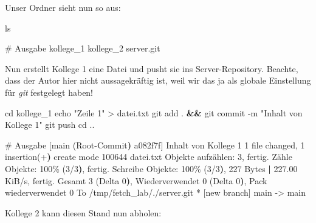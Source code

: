 \documentclass[
  ngerman,
  letterpaper,
  DIV=11]{scrreprt}
\newenvironment{Shaded}{\begin{snugshade}}{\end{snugshade}}
\newcommand{\AttributeTok}[1]{\textcolor[rgb]{0.40,0.45,0.13}{#1}}
\newcommand{\BuiltInTok}[1]{\textcolor[rgb]{0.00,0.23,0.31}{#1}}
\newcommand{\CommentTok}[1]{\textcolor[rgb]{0.37,0.37,0.37}{#1}}
\newcommand{\ErrorTok}[1]{\textcolor[rgb]{0.68,0.00,0.00}{#1}}
\newcommand{\ExtensionTok}[1]{\textcolor[rgb]{0.00,0.23,0.31}{#1}}
\newcommand{\FunctionTok}[1]{\textcolor[rgb]{0.28,0.35,0.67}{#1}}
\newcommand{\KeywordTok}[1]{\textcolor[rgb]{0.00,0.23,0.31}{\textbf{#1}}}
\newcommand{\NormalTok}[1]{\textcolor[rgb]{0.00,0.23,0.31}{#1}}
\newcommand{\OperatorTok}[1]{\textcolor[rgb]{0.37,0.37,0.37}{#1}}
\newcommand{\StringTok}[1]{\textcolor[rgb]{0.13,0.47,0.30}{#1}}
\newcommand{\git}{\textit{git}\xspace}
\begin{document}
Unser Ordner sieht nun so aus:

\begin{Shaded}
\begin{Highlighting}[]
\FunctionTok{ls} 

\CommentTok{\# Ausgabe}
\ExtensionTok{kollege\_1}\NormalTok{  kollege\_2  server.git}
\end{Highlighting}
\end{Shaded}

Nun erstellt Kollege 1 eine Datei und pusht sie ins Server-Repository.
Beachte, dass der Autor hier nicht aussagekräftig ist, weil wir das ja
als globale Einstellung für \git festgelegt haben!

\begin{Shaded}
\begin{Highlighting}[]
\BuiltInTok{cd}\NormalTok{ kollege\_1 }
\BuiltInTok{echo} \StringTok{"Zeile 1"} \OperatorTok{\textgreater{}}\NormalTok{ datei.txt }
\FunctionTok{git}\NormalTok{ add . }\KeywordTok{\&\&} \FunctionTok{git}\NormalTok{ commit }\AttributeTok{{-}m} \StringTok{"Inhalt von Kollege 1"}
\FunctionTok{git}\NormalTok{ push }
\BuiltInTok{cd}\NormalTok{ ..}

\CommentTok{\# Ausgabe}
\ExtensionTok{[main} \ErrorTok{(}\ExtensionTok{Root{-}Commit}\KeywordTok{)} \ExtensionTok{a082f7f]}\NormalTok{ Inhalt von Kollege 1}
 \ExtensionTok{1}\NormalTok{ file changed, 1 insertion}\ErrorTok{(}\ExtensionTok{+}\KeywordTok{)}
 \ExtensionTok{create}\NormalTok{ mode 100644 datei.txt}
\ExtensionTok{Objekte}\NormalTok{ aufzählen: 3, fertig.}
\ExtensionTok{Zähle}\NormalTok{ Objekte: 100\% }\ErrorTok{(}\ExtensionTok{3/3}\KeywordTok{)}\ExtensionTok{,}\NormalTok{ fertig.}
\ExtensionTok{Schreibe}\NormalTok{ Objekte: 100\% }\ErrorTok{(}\ExtensionTok{3/3}\KeywordTok{)}\ExtensionTok{,}\NormalTok{ 227 Bytes }\KeywordTok{|} \ExtensionTok{227.00}\NormalTok{ KiB/s, fertig.}
\ExtensionTok{Gesamt}\NormalTok{ 3 }\ErrorTok{(}\ExtensionTok{Delta}\NormalTok{ 0}\KeywordTok{)}\ExtensionTok{,}\NormalTok{ Wiederverwendet 0 }\ErrorTok{(}\ExtensionTok{Delta}\NormalTok{ 0}\KeywordTok{)}\ExtensionTok{,}\NormalTok{ Pack wiederverwendet 0}
\ExtensionTok{To}\NormalTok{ /tmp/fetch\_lab/./server.git}
 \ExtensionTok{*}\NormalTok{ [new branch]      main }\AttributeTok{{-}}\OperatorTok{\textgreater{}}\NormalTok{ main}
\end{Highlighting}
\end{Shaded}

Kollege 2 kann diesen Stand nun abholen:
\end{document}

